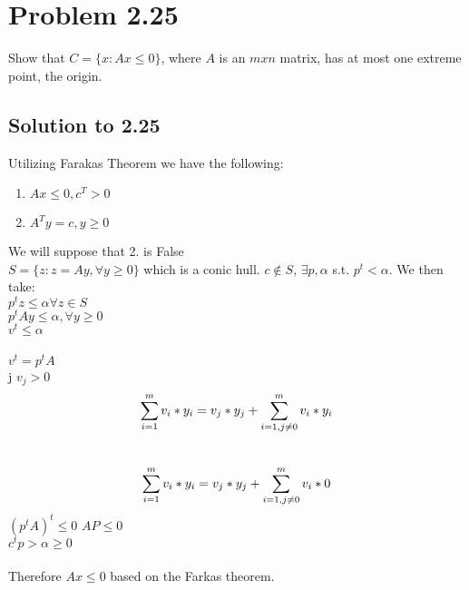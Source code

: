 \documentclass[12pt]{article}
\begin{document}
\section{Problem 2.25}
Show that $C=\{x: Ax \leq 0\}$, where $A$ is an $m x n$ matrix, has at most one extreme point, the origin.\\
\subsection{Solution to 2.25}
Utilizing Farakas Theorem we have the following: 
\begin{enumerate}
    \item $Ax \leq 0, c^T > 0 $
    \item $A^T y = c, y \geq 0 $
\end{enumerate}
We will suppose that 2. is False \Rightarrow {}\\ 
$S = \{ z: z = Ay, \forall y \geq 0 \}$ which is a conic hull. 
\rightarrow $c \notin S$, $\exists p, \alpha$ s.t. $p^t < \alpha$.
We then take:\\
\quad \quad \quad \quad $p^tz \leq \alpha \forall z \in S$\\
\quad \quad \quad \quad $p^tAy \leq \alpha, \forall y \geq 0$\\
\quad \quad \quad \quad $v^t \leq \alpha$\\
\Rightarrow \alpha {}\\
\quad \quad \quad \quad $v^t = p^tA$\\
\quad \quad \quad \quad \exists j $v_j > 0$\\
\begin{equation*}
    \sum_{i=1}^{m} v_i* y_i = v_j*y_j + \sum_{i=1, j \neq 0}^{m}v_i* y_i\\
\end{equation*}
\Leftrightarrow \\
\begin{equation*}
    \sum_{i=1}^{m} v_i* y_i = v_j*y_j + \sum_{i=1, j \neq 0}^{m}v_i* 0\\
\end{equation*}
$(p^tA)^t \leq 0$ \leftrightarrow $AP \leq 0$\\
$c^tp > \alpha \geq 0$\\ \\
Therefore $Ax \leq 0$ based on the Farkas theorem.
\end{document}
